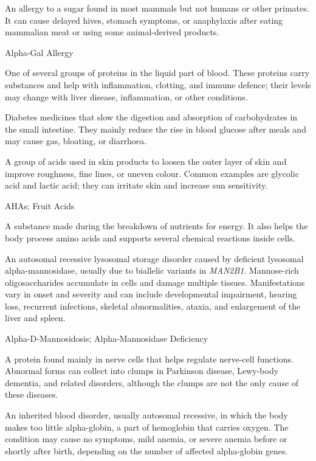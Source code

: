  An allergy to a sugar found in most mammals but not humans or other primates. It can cause delayed hives, stomach symptoms, or anaphylaxis after eating mammalian meat or using some animal-derived products.

\synonyms
Alpha-Gal Allergy

 One of several groups of proteins in the liquid part of blood. These proteins carry substances and help with inflammation, clotting, and immune defence; their levels may change with liver disease, inflammation, or other conditions.

 Diabetes medicines that slow the digestion and absorption of carbohydrates in the small intestine. They mainly reduce the rise in blood glucose after meals and may cause gas, bloating, or diarrhoea.

 A group of acids used in skin products to loosen the outer layer of skin and improve roughness, fine lines, or uneven colour. Common examples are glycolic acid and lactic acid; they can irritate skin and increase sun sensitivity.

\synonyms
AHAs; Fruit Acids

 A substance made during the breakdown of nutrients for energy. It also helps the body process amino acids and supports several chemical reactions inside cells.

 An autosomal recessive lysosomal storage disorder caused by deficient
lysosomal alpha-mannosidase, usually due to biallelic variants in \textit{MAN2B1}. Mannose-rich
oligosaccharides accumulate in cells and damage multiple tissues. Manifestations vary in onset and
severity and can include developmental impairment, hearing loss, recurrent infections, skeletal
abnormalities, ataxia, and enlargement of the liver and spleen.

\synonyms
Alpha-D-Mannosidosis; Alpha-Mannosidase Deficiency

 A protein found mainly in nerve cells that helps regulate nerve-cell functions. Abnormal forms can collect into clumps in Parkinson disease, Lewy-body dementia, and related disorders, although the clumps are not the only cause of these diseases.

 An inherited blood disorder, usually autosomal recessive, in which the body makes too little alpha-globin, a part of hemoglobin that carries oxygen. The condition may cause no symptoms, mild anemia, or severe anemia before or shortly after birth, depending on the number of affected alpha-globin genes.

